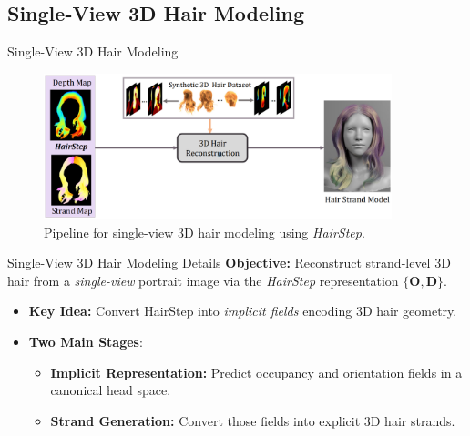 \subsection{Single-View 3D Hair Modeling}

\begin{frame}[t]{Single-View 3D Hair Modeling}
    \begin{figure}[t]
        \centering
        \includegraphics[width=0.9\textwidth]{assets/figures/method/reconstruction.png}
        \caption{Pipeline for single-view 3D hair modeling using \emph{HairStep}.}
        \label{fig:single_view_3d_hair_modeling}
    \end{figure}
\end{frame}

\begin{frame}[t]{Single-View 3D Hair Modeling Details}
    \textbf{Objective:} Reconstruct strand-level 3D hair from a \emph{single-view} portrait image via the \emph{HairStep} representation $\{\mathbf{O}, \mathbf{D}\}$.
    \begin{itemize}
        \item \textbf{Key Idea:} Convert HairStep into \emph{implicit fields} encoding 3D hair geometry.
        \item \textbf{Two Main Stages}:
        \begin{itemize}
            \item \textbf{Implicit Representation:} Predict occupancy and orientation fields in a canonical head space.
            \item \textbf{Strand Generation:} Convert those fields into explicit 3D hair strands.
        \end{itemize}
    \end{itemize}
\end{frame}

